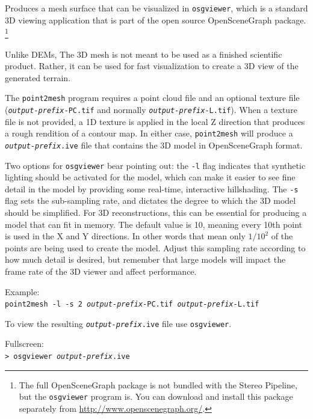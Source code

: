 Produces a mesh surface that can be visualized in {\tt osgviewer},
which is a standard 3D viewing application that is part of the open
source OpenSceneGraph package.  \footnote{The full OpenSceneGraph package
is not bundled with the Stereo Pipeline, but the \texttt{osgviewer} program
is.  You can download and install this package separately from 
\url{http://www.openscenegraph.org/}.}

Unlike \acp{DEM}, The 3D mesh is not meant to be used as a finished
scientific product.  Rather, it can be used for fast visualization
to create a 3D view of the generated terrain.

The \texttt{point2mesh} program requires a point cloud file and an
optional texture file (\texttt{\textit{output-prefix}-PC.tif} and
normally \texttt{\textit{output-prefix}-L.tif}). When a texture
file is not provided, a 1D texture is applied in the local Z direction
that produces a rough rendition of a contour map.  In either case,
\texttt{point2mesh} will produce a \texttt{\textit{output-prefix}.ive}
file that contains the 3D model in OpenSceneGraph format.

Two options for \texttt{osgviewer} bear pointing out: the \texttt{-l}
flag indicates that synthetic lighting should be activated for the
model, which can make it easier to see fine detail in the model by
providing some real-time, interactive hillshading.  The \verb#-s#
flag sets the sub-sampling rate, and dictates the degree to which
the 3D model should be simplified.  For 3D reconstructions, this
can be essential for producing a model that can fit in memory.  The
default value is 10, meaning every 10th point is used in the X and
Y directions. In other words that mean only $1/10^2$ of the points
are being used to create the model. Adjust this sampling rate
according to how much detail is desired, but remember that large
models will impact the frame rate of the 3D viewer and affect
performance.

Example:\\
\hspace*{2em}\texttt{point2mesh -l -s 2 \textit{output-prefix}-PC.tif \textit{output-prefix}-L.tif}

To view the resulting \texttt{\textit{output-prefix}.ive} file use 
\texttt{osgviewer}.

\hspace*{2em}Fullscreen:\\
\hspace*{2em}\texttt{> osgviewer \textit{output-prefix}.ive}

